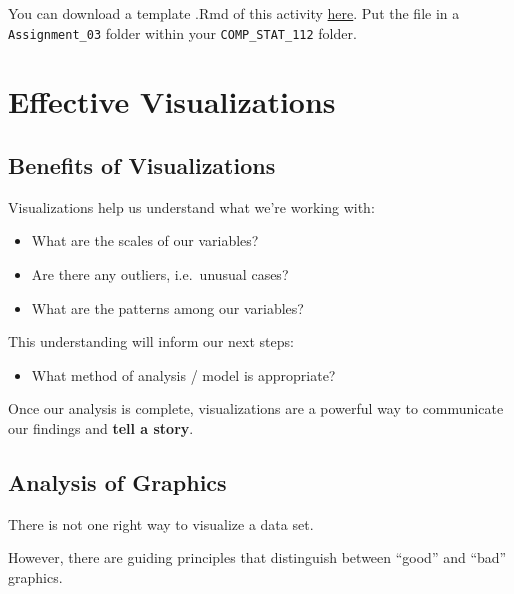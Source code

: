 \documentclass[
  letterpaper,
  DIV=11,
  numbers=noendperiod]{scrreprt}
\providecommand{\tightlist}{%
  \setlength{\itemsep}{0pt}\setlength{\parskip}{0pt}}\usepackage{longtable,booktabs,array}
\begin{document}
You can download a template .Rmd of this activity
\href{template_rmd/03-Effective_Viz_Assign.Rmd}{here}. Put the file in a
\texttt{Assignment\_03} folder within your \texttt{COMP\_STAT\_112}
folder.

\section*{Effective Visualizations}\label{effective-visualizations-1}


\subsection*{Benefits of
Visualizations}\label{benefits-of-visualizations-1}

Visualizations help us understand what we're working with:

\begin{itemize}
\tightlist
\item
  What are the scales of our variables?\\
\item
  Are there any outliers, i.e.~unusual cases?\\
\item
  What are the patterns among our variables?
\end{itemize}

This understanding will inform our next steps:

\begin{itemize}
\tightlist
\item
  What method of analysis / model is appropriate?
\end{itemize}

Once our analysis is complete, visualizations are a powerful way to
communicate our findings and \textbf{tell a story}.

\subsection*{Analysis of Graphics}\label{analysis-of-graphics}

There is not one right way to visualize a data set.

However, there are guiding principles that distinguish between ``good''
and ``bad'' graphics.
\end{document}
